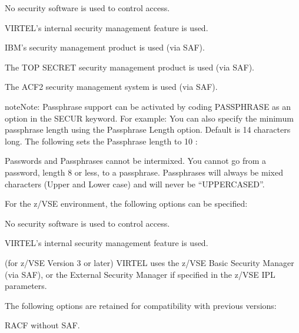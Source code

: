 \documentclass[letterpaper,10pt,english]{sphinxmanual}
\begin{document}
\sphinxAtStartPar
{} \sphinxhyphen{} No security software is used to control access.

\sphinxAtStartPar
{} \sphinxhyphen{} VIRTEL’s internal security management feature is used.

\sphinxAtStartPar
{} \sphinxhyphen{} IBM’s security management product is used (via SAF).

\sphinxAtStartPar
{} \sphinxhyphen{} The TOP SECRET security management product is used (via SAF).

\sphinxAtStartPar
{} \sphinxhyphen{} The ACF2 security management system is used (via SAF).

\begin{sphinxadmonition}{note}{Note:}
\sphinxAtStartPar
Passphrase support can be activated by coding PASSPHRASE as an option in the SECUR keyword. For example: 
You can also specify the minimum passphrase length using the Passphrase Length option. Default is 14 characters long.
The following sets the Passphrase length to 10 :

\sphinxAtStartPar
Passwords and Passphrases cannot be intermixed. You cannot go from a password, length 8 or less, to a passphrase. Passphrases will always be mixed characters (Upper and Lower case) and will never be “UPPERCASED”.
\end{sphinxadmonition}

\sphinxAtStartPar
For the z/VSE environment, the following options can be specified:

\sphinxAtStartPar
{} \sphinxhyphen{} No security software is used to control access.

\sphinxAtStartPar
{} \sphinxhyphen{} VIRTEL’s internal security management feature is used.

\sphinxAtStartPar
{} \sphinxhyphen{} (for z/VSE Version 3 or later) VIRTEL uses the z/VSE Basic Security Manager (via SAF), or the External Security Manager if specified in the z/VSE IPL parameters.

\sphinxAtStartPar
The following options are retained for compatibility with previous versions:

\sphinxAtStartPar
{} \sphinxhyphen{} RACF without SAF.
\end{document}
